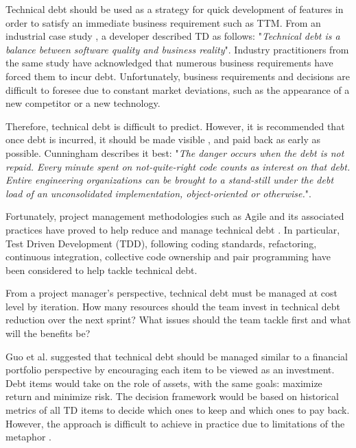\documentclass{mprop}
\begin{document}
Technical debt should be used as a strategy for quick development of features in
order to satisfy an immediate business requirement such as TTM. From an
industrial case study \cite{Lim2012}, a developer described TD as follows:
"\textit{Technical debt is a balance between software quality and business
	reality}". Industry practitioners from the same study have acknowledged that
numerous business requirements have forced them to incur debt. Unfortunately,
business requirements and decisions are difficult to foresee due to constant
market deviations, such as the appearance of a new competitor or a new
technology.

Therefore, technical debt is difficult to predict. However, it is recommended
that once debt is incurred, it should be made visible \cite{Lim2012}
\cite{Codabux2013} \cite{Morgenthaler2012}, and paid back as early as possible.
Cunningham \cite{Cunningham1993} describes it best: "\textit{The danger occurs
when the debt is not repaid. Every minute spent on not-quite-right code counts
as interest on that debt. Entire engineering organizations can be brought to a
stand-still under the debt load of an unconsolidated implementation,
object-oriented or otherwise.}".

Fortunately, project management methodologies such as Agile and its associated
practices have proved to help reduce and manage technical debt
\cite{Holvitie2014} \cite{Trumler2016}. In particular, Test Driven Development (TDD),
following coding standards, refactoring, continuous integration, collective code
ownership and pair programming have been considered to help tackle technical
debt.

From a project manager's perspective, technical debt must be managed at cost
level by iteration. How many resources should the team invest in technical debt
reduction over the next sprint? What issues should the team tackle first and
what will the benefits be?

Guo et al. \cite{Guo2011} suggested that technical debt should be managed
similar to a financial portfolio perspective by encouraging each item to be
viewed as an investment. Debt items would take on the role of assets, with the
same goals: maximize return and minimize risk. The decision framework would be
based on historical metrics of all TD items to decide which ones to keep and
which ones to pay back. However, the approach is difficult to achieve in
practice due to limitations of the metaphor \cite{Schmid2013}.
\end{document}
